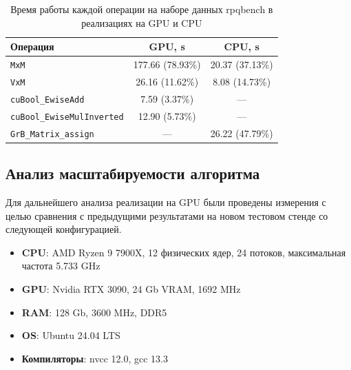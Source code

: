 \begin{table}[ht]
\centering
\caption{Время работы каждой операции на наборе данных rpqbench в реализациях на GPU и CPU}
\label{tab:RpqBenchVtune}
\begin{tabular}{|l|c|c|}
\hline
Операция & GPU, \si{\second} & CPU, \si{\second} \\
\hline
\centering
\verb|MxM| & 177.66 (78.93\%) & 20.37 (37.13\%)  \\
\verb|VxM| & 26.16 (11.62\%) & 8.08 (14.73\%) \\
\verb|cuBool_EwiseAdd| & 7.59 (3.37\%) & --- \\
\verb|cuBool_EwiseMulInverted| & 12.90 (5.73\%) & --- \\
\verb|GrB_Matrix_assign| & --- & 26.22 (47.79\%) \\
\hline
\end{tabular}
\end{table}

\newpage
\subsection{Анализ масштабируемости алгоритма}


Для дальнейшего анализа реализации на GPU были проведены измерения с целью сравнения с предыдущими результатами  
на новом тестовом стенде со следующей конфигурацией.
\begin{itemize}
    \item \textbf{CPU}: AMD Ryzen 9 7900X, 12 физических ядер, 24 потоков, максимальная частота 5.733 GHz
    \item \textbf{GPU}: Nvidia RTX 3090, 24 Gb VRAM, 1692 MHz
    \item \textbf{RAM}: 128 Gb, 3600 MHz, DDR5
    \item \textbf{OS}: Ubuntu 24.04 LTS
    \item \textbf{Компиляторы}: nvcc 12.0, gcc 13.3
\end{itemize}

